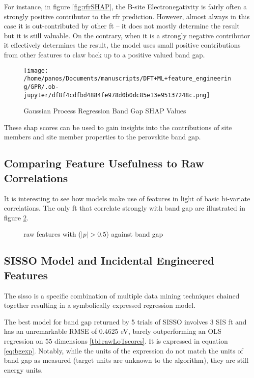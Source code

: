 \documentclass[aip, jmp, amsmath, amssymb, nofootinbib]{revtex4-2}
\begin{document}
For instance, in figure \ref{fig:rfrSHAP}, the B-site Electronegativity
is fairly often a strongly positive contributor to the \acrshort{rfr}
prediction. However, almost always in this case it is out-contributed
by other \gls{ft} -- it does not mostly determine the result but it is
still valuable. On the contrary, when it is a strongly negative
contributor it effectively determines the result, the model uses small
positive contributions from other features to claw back up to a
positive valued band gap.

\begin{figure}[htbp]
\centering
\texttt{[image: /home/panos/Documents/manuscripts/DFT+ML+feature\_engineering/GPR/.ob-jupyter/df8f4cdfbd4884fe978d0b0dc85e13e95137248c.png]}
\caption{\label{fig:gprSHAP} Gaussian Process Regression Band Gap SHAP Values}
\end{figure}

These \acrshort{shap} scores can be used to gain insights into the contributions
of site members and site member properties to the perovskite band
gap.

\subsection*{Comparing Feature Usefulness to Raw Correlations}
\label{sec:org9b99795}
It is interesting to see how models make use of features in light of
basic bi-variate correlations. The only \gls{ft} that correlate
strongly with band gap are illustrated in figure \ref{fig:rpear}.

 
\begin{figure}[htbp]
\centering

\caption{\label{fig:rpear} raw features with (\(|p|>0.5\)) against band gap}
\end{figure}

\subsection*{SISSO Model and Incidental Engineered Features}
\label{sec:org5e62738}
The \Acrfull{sisso}
\cite{ouyang-2018-sisso,ghiringhelli-2017-learn-physic} is a specific
combination of multiple data mining techniques chained together
resulting in a symbolically expressed regression model.

The best model for band gap returned by 5 trials of SISSO involves 3
SIS \gls{ft} and has an unremarkable RMSE of 0.4625 eV, barely
outperforming an OLS regression on 55 dimensions
\ref{tbl:rawLoTscores}. It is expressed in equation
\ref{eq:bgexp}. Notably, while the units of the expression do not match
the units of band gap as measured (target units are unknown to the
algorithm), they are still energy units.
\end{document}
